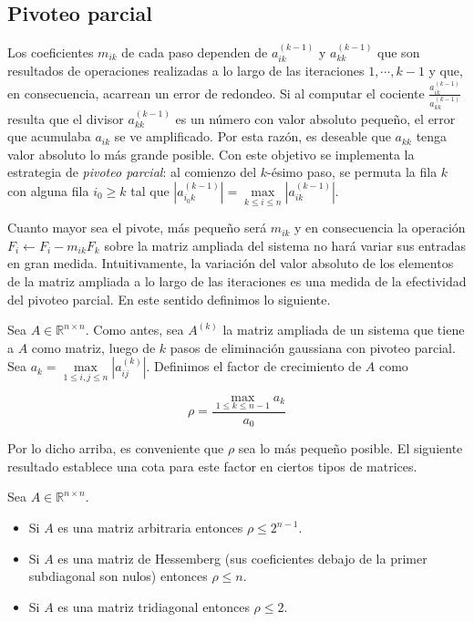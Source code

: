 \subsection{Pivoteo parcial}

Los coeficientes $m_{ik}$ de cada paso dependen de $a_{ik}^{(k - 1)}$ y $a_{kk}^{(k - 1)}$ que son resultados de operaciones realizadas a lo largo de las iteraciones $1, \cdots, k - 1$ y que, en consecuencia, acarrean un error de redondeo. Si al computar el cociente $\frac{a_{ik}^{(k - 1)}}{a_{kk}^{(k - 1)}}$ resulta que el divisor $a_{kk}^{(k - 1)}$ es un número con valor absoluto pequeño, el error que acumulaba $a_{ik}$ se ve amplificado. Por esta razón, es deseable que $a_{kk}$ tenga valor absoluto lo más grande posible. Con este objetivo se implementa la estrategia de \emph{pivoteo parcial}: al comienzo del $k$-ésimo paso, se permuta la fila $k$ con alguna fila $i_0 \geq k$ tal que $|a_{i_0k}^{(k - 1)}| = \max\limits_{k \leq i \leq n} |a_{ik}^{(k - 1)}|$.

Cuanto mayor sea el pivote, más pequeño será $m_{ik}$ y en consecuencia la operación  $F_i \leftarrow F_i - m_{ik}F_k$ sobre la matriz ampliada del sistema no hará variar sus entradas en gran medida. Intuitivamente, la variación del valor absoluto de los elementos de la matriz ampliada a lo largo de las iteraciones es una medida de la efectividad del pivoteo parcial. En este sentido definimos lo siguiente.

\begin{defi}
Sea $A \in \mathbb{R}^{n \times n}$. Como antes, sea $A^{(k)}$ la matriz ampliada de un sistema que tiene a $A$ como matriz, luego de $k$ pasos de eliminación gaussiana con pivoteo parcial. Sea $a_k = \max\limits_{1 \leq i, j \leq n} |a_{ij}^{(k)}|$. Definimos el factor de crecimiento de $A$ como

\[
\rho = \frac{\max\limits_{1\leq k \leq n - 1}a_k}{a_0}
\]
\end{defi}

Por lo dicho arriba, es conveniente que $\rho$ sea lo más pequeño posible. El siguiente resultado establece una cota para este factor en ciertos tipos de matrices.

\begin{propo} Sea $A \in \mathbb{R}^{n \times n}$.
\begin{itemize}
\item Si $A$ es una matriz arbitraria entonces $\rho \leq 2^{n - 1}$.
\item Si $A$ es una matriz de Hessemberg (sus coeficientes debajo de la primer subdiagonal son nulos) entonces $\rho \leq n$.
\item Si $A$ es una matriz tridiagonal entonces $\rho \leq 2$.
\end{itemize}
\end{propo}

